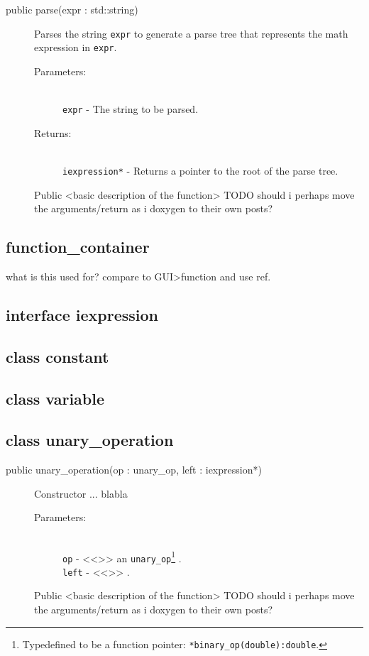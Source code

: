 \documentclass[a4paper,11pt]{kth-mag}
\begin{document}

\begin{description}
    \item[public parse(expr : std::string)] Parses the string \texttt{expr} to
    generate a parse tree that represents the math expression in \texttt{expr}.
    \begin{description}
            \item[Parameters:]~\\
                \verb+expr+ - The string to be parsed.
            \item[Returns:]~\\
                \verb+iexpression*+ - Returns a pointer to the root of the
                parse tree.

        \end{description}
        Public <basic description of the function> TODO should i perhaps move the arguments/return as i doxygen to their own posts?
\end{description}

\subsection{function\_container}
what is this used for? compare to GUI>function and use ref.
\subsection{interface iexpression}

\subsection{class constant}
\subsection{class variable}
\subsection{class unary\_operation}
\begin{description}
    \item[public unary\_operation(op : unary\_op, left : iexpression*)] Constructor ...
    blabla 
    \begin{description}
            \item[Parameters:]~\\
                \verb+op+ - <<>> an \texttt{unary\_op}\footnote{Typedefined to
                be a function pointer: \texttt{*binary\_op(double):double}.} .\\
                \verb+left+ - <<>> .
        \end{description}
        Public <basic description of the function> TODO should i perhaps move the arguments/return as i doxygen to their own posts?
\end{description}
\end{document}
